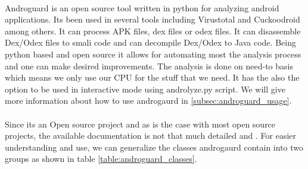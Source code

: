 \documentclass[../main.tex]{subfile}
\begin{document}
		\paragraph{} Androguard is an open source tool written in python for analyzing android applications. Its been used in several tools including Virustotal and Cuckoodroid among others. It can process APK files, dex files or odex files. It can disassemble Dex/Odex files to smali code and can decompile Dex/Odex to Java code. Being python based and open source it allows for automating most the analysis process and one can make desired improvements. The analysis is done on need-to basis which means we only use our CPU for the stuff that we need. It has the also the option to be used in interactive mode using androlyze.py script. We will give more information about how to use androgaurd in \ref{subsec:androguard_usage}.
		
		\paragraph{} Since its an Open source project and as is the case with most open source projects, the available documentation is not that much detailed and . For easier understanding and use, we can generalize the classes androgaurd contain into two groups as shown in table \ref{table:androguard_classes}.
				
\end{document}
